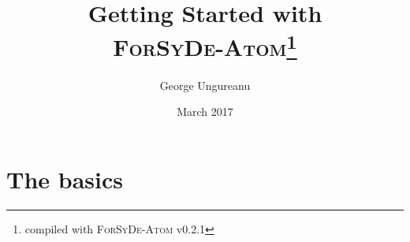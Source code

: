 \documentclass{article}
\title{Getting Started with \\\textsc{ForSyDe-Atom}\thanks{compiled with \textsc{ForSyDe-Atom} v0.2.1}}
\author{George Ungureanu}
\date{March 2017}
\begin{document}
\maketitle

\begin{abstract}

\end{abstract}



\newpage
\tableofcontents
\newpage



\section{The basics}
\label{sec:basic-usage}





\end{document}
